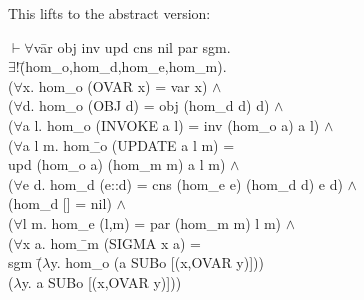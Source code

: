 \documentclass[envcountsame,runningheads]{llncs}
\begin{document}
This lifts to the abstract version:
{\tt \begin{tabbing}
$\vdash \forall$v\=ar obj inv upd cns nil par sgm. \\
\>   $\exists !$\=(hom\_o,hom\_d,hom\_e,hom\_m). \\
\>\>   ($\forall$x. hom\_o (OVAR x) = var x) $\wedge$ \\
\>\>   ($\forall$d. hom\_o (OBJ d) = obj (hom\_d d) d) $\wedge$ \\
\>\>   ($\forall$a l. hom\_o (INVOKE a l) = inv (hom\_o a) a l) $\wedge$ \\
\>\>   ($\forall$a l m. hom\=\_o (UPDATE a l m) = \\
\>\>\>             upd (hom\_o a) (hom\_m m) a l m) $\wedge$ \\
\>\>   ($\forall$e d. hom\_d (e::d) = cns (hom\_e e) (hom\_d d) e d) $\wedge$ \\
\>\>   (hom\_d [] = nil) $\wedge$ \\
\>\>   ($\forall$l m. hom\_e (l,m) = par (hom\_m m) l m) $\wedge$ \\
\>\>   ($\forall$x a. hom\=\_m (SIGMA x a) = \\
\>\>\>           sgm \=($\lambda$y. hom\_o (a SUBo [(x,OVAR y)])) \\
\>\>\>\>             ($\lambda$y. a SUBo [(x,OVAR y)]))
\end{tabbing}}
%
\end{document}

